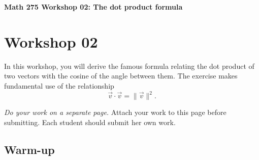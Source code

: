 \documentclass[12pt]{exam}
\begin{document}
\noindent
\textbf{{\large Math 275 \hfill Workshop 02: The dot product formula}}

\noindent
{}

\noindent
{}

\noindent

\section{Workshop 02}

In this workshop, you will derive the famous formula relating the dot
product of two vectors with the cosine of the angle between them. The
exercise makes fundamental use of the relationship
\[ \vec{v} \cdot \vec{v} = \lVert \vec{v} \rVert^2. \]

\emph{Do your work on a separate page.} Attach your work to this page
before submitting. Each student should submit her own work.

\subsection{Warm-up}
\end{document}
